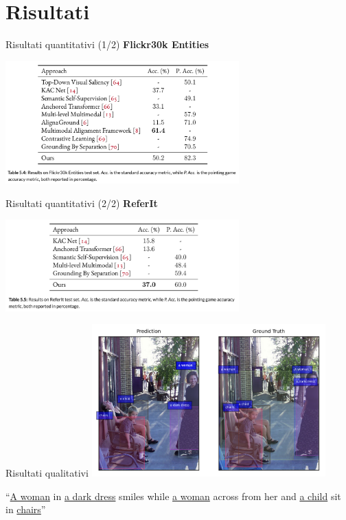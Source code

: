 \documentclass{beamer}
\begin{document}
\section{Risultati}

\begin{frame}{Risultati quantitativi (1/2)}
  \textbf{Flickr30k Entities}
  \begin{center}
    \includegraphics[width=9cm]{images/flickr30k-results.png}
  \end{center}
\end{frame}

\begin{frame}{Risultati quantitativi (2/2)}
  \textbf{ReferIt}
  \begin{center}
    \includegraphics[width=9cm]{images/referit-results.png}
  \end{center}
\end{frame}

\begin{frame}{Risultati qualitativi}
  \centering
  \includegraphics[width=9cm]{images/similing-woman.png}
  
  ``\underline{A woman} in \underline{a dark dress} smiles while
  \underline{a woman} across from her and \underline{a child} sit in
  \underline{chairs}''
\end{frame}
\end{document}
